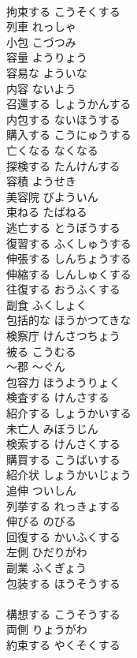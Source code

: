 \documentclass[8pt]{extreport}
\begin{document}
\begin{CJK}{UTF8}{min}
\\	拘束する	こうそくする	
\\	列車	れっしゃ	
\\	小包	こづつみ	
\\	容量	ようりょう	
\\	容易な	よういな	
\\	内容	ないよう	
\\	召還する	しょうかんする	
\\	内包する	ないほうする	
\\	購入する	こうにゅうする	
\\	亡くなる	なくなる	
\\	探検する	たんけんする	
\\	容積	ようせき	
\\	美容院	びよういん	
\\	束ねる	たばねる	
\\	逃亡する	とうぼうする	
\\	復習する	ふくしゅうする	
\\	伸張する	しんちょうする	
\\	伸縮する	しんしゅくする	
\\	往復する	おうふくする	
\\	副食	ふくしょく	
\\	包括的な	ほうかつてきな	
\\	検察庁	けんさつちょう	
\\	被る	こうむる	
\\	～郡	～ぐん	
\\	包容力	ほうようりょく	
\\	検査する	けんさする	
\\	紹介する	しょうかいする	
\\	未亡人	みぼうじん	
\\	検索する	けんさくする	
\\	購買する	こうばいする	
\\	紹介状	しょうかいじょう	
\\	追伸	ついしん	
\\	列挙する	れっきょする	
\\	伸びる	のびる	
\\	回復する	かいふくする	
\\	左側	ひだりがわ	
\\	副業	ふくぎょう	
\\	包装する	ほうそうする	
\\	[漢語]
\\	構想する	こうそうする	
\\	両側	りょうがわ	
\\	約束する	やくそくする	

\end{CJK}
\end{document}
